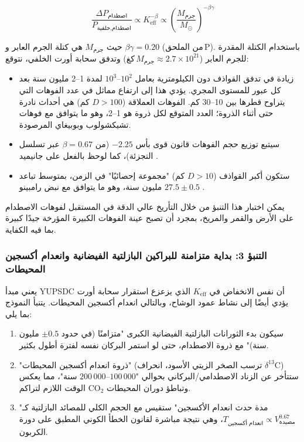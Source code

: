\documentclass[11pt,a4paper]{article}
\begin{document}
	\[
	\frac{\Delta P_{\text{اصطدام}}}{P_{\text{اصطدام,خلفية}}} \propto K_{\mathrm{eff}}^{-\beta} \propto \left(\frac{M_{\text{جرم}}}{M_{\odot}}\right)^{-\beta\gamma}
	\]
	
	حيث \(M_{\text{جرم}}\) هي كتلة الجرم العابر و \(\beta\gamma = 0.20\) (من الملحق P). باستخدام الكتلة المقدرة للجرم العابر (\(M_{\text{جرم}} \approx 2.7\times10^{21}\) كغ) وتدفق سحابة أورت الخلفي، نتوقع:
	
	\begin{itemize}
		\item زيادة في تدفق القواذف دون الكيلومترية بعامل \(10^{2}\)–\(10^{3}\) لمدة 1–2 مليون سنة بعد كل عبور للمستوى المجري. يؤدي هذا إلى ارتفاع مماثل في عدد الفوهات التي يتراوح قطرها بين 10–30 كم. الفوهات العملاقة (\(D>100\) كم) هي أحداث نادرة حتى أثناء الذروة؛ العدد المتوقع لكل ذروة هو 1–2، وهو ما يتوافق مع فوهات تشيكشولوب وبوبيغاي المرصودة.
		\item سيتبع توزيع حجم الفوهات قانون قوى بأس \(-2.25\) (من \(\beta=0.67\) عبر تسلسل التجزئة)، كما لوحظ بالفعل على جانيميد \cite{Schenk2004}.
		\item ستكون أكبر القواذف (\(D>10\) كم) "مجموعة إحصائيًا" في الزمن، بمتوسط تباعد \(27.5 \pm 0.5\) مليون سنة، وهو ما يتوافق مع نبض رامبينو \cite{Rampino2021}.
	\end{itemize}
	
	يمكن اختبار هذا التنبؤ من خلال التأريخ عالي الدقة في المستقبل لفوهات الاصطدام على الأرض والقمر والمريخ، بمجرد أن تصبح عينة الفوهات الكبيرة المؤرخة جيدًا كبيرة بما فيه الكفاية.
	
	\subsubsection{التنبؤ 3: بداية متزامنة للبراكين البازلتية الفيضانية وانعدام أكسجين المحيطات}
	
	يعني مبدأ YUPSDC أن نفس الانخفاض في \(K_{\mathrm{eff}}\) الذي يزعزع استقرار سحابة أورت يؤدي أيضًا إلى نشاط عمود الوشاح، وبالتالي انعدام أكسجين المحيطات. يتنبأ النموذج بما يلي:
	
	\begin{enumerate}
		\item سيكون بدء الثورانات البازلتية الفيضانية الكبرى "متزامنًا (في حدود \(\pm 0.5\) مليون سنة)" مع ذروة الاصطدام، حتى لو استمر البركان نفسه لفترة أطول بكثير.
		\item "ذروة انعدام أكسجين المحيطات" (ترسب الصخر الزيتي الأسود، انحراف \(\delta^{13}\)C) ستتأخر عن الزناد الاصطدامي/البركاني بحوالي "\(100\,000\)–\(200\,000\) سنة"، مما يعكس الوقت اللازم لتراكم CO\(_2\) وتباطؤ دوران المحيطات.
		\item "مدة حدث انعدام الأكسجين" ستقيس مع الحجم الكلي للمصائد البازلتية كـ \(T_{\text{انعدام أكسجين}} \propto V_{\text{مصيدة}}^{0.67}\)، وهي نتيجة مباشرة لقانون الخطأ الكوني المطبق على دورة الكربون.
	\end{enumerate}
	
\end{document}
